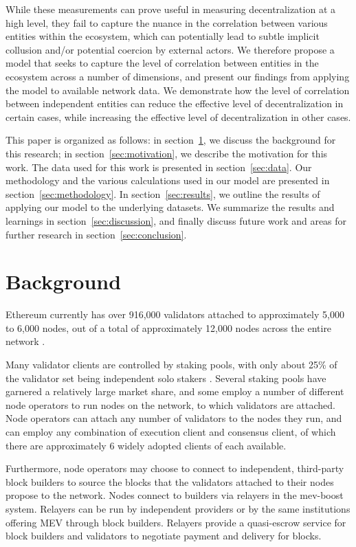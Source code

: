 \documentclass[conference]{IEEEtran}
\begin{document}
While these measurements can prove useful in measuring decentralization at a high level, they fail to capture the nuance in the correlation between various entities within the ecosystem, which can potentially lead to subtle implicit collusion and/or potential coercion by external actors.  We therefore propose a model that seeks to capture the level of correlation between entities in the ecosystem across a number of dimensions, and present our findings from applying the model to available network data.  We demonstrate how the level of correlation between independent entities can reduce the effective level of decentralization in certain cases, while increasing the effective level of decentralization in other cases.

This paper is organized as follows: in section~\ref{sec:background}, we discuss the background for this research; in section~\ref{sec:motivation}, we describe the motivation for this work. The data used for this work is presented in section~\ref{sec:data}. Our methodology and the various calculations used in our model are presented in section~\ref{sec:methodology}.  In section~\ref{sec:results}, we outline the results of applying our model to the underlying datasets. We summarize the results and learnings in section~\ref{sec:discussion}, and finally discuss future work and areas for further research in section~\ref{sec:conclusion}.

\section{Background}
\label{sec:background}

Ethereum currently has over 916,000 validators \cite{beaconchain2024} attached to approximately 5,000 to 6,000 nodes, out of a total of approximately 12,000 nodes across the entire network \cite{nodewatch2024}.

Many validator clients are controlled by staking pools, with only about 25\% of the validator set being independent solo stakers \cite{dune2024}.  Several staking pools have garnered a relatively large market share, and some employ a number of different node operators to run nodes on the network, to which validators are attached.  Node operators can attach any number of validators to the nodes they run, and can employ any combination of execution client and consensus client, of which there are approximately 6 widely adopted clients of each available.

Furthermore, node operators may choose to connect to independent, third-party block builders to source the blocks that the validators attached to their nodes propose to the network. Nodes connect to builders via relayers in the mev-boost system.  Relayers can be run by independent providers or by the same institutions offering MEV through block builders. Relayers provide a quasi-escrow service for block builders and validators to negotiate payment and delivery for blocks.
\end{document}
